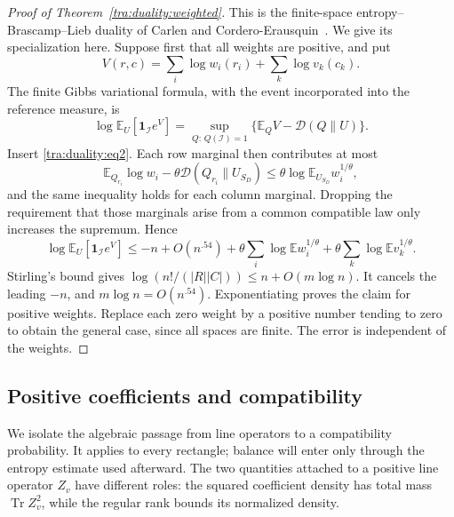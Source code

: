 \begin{proof}[Proof of Theorem~\ref{tra:duality:weighted}]\label{tra:duality:weighted-proof}
\label{tra:duality:entropy-duality-proof}
This is the finite-space entropy--Brascamp--Lieb duality of Carlen and Cordero-Erausquin~\cite[Theorem~2.1]{CarlenCorderoErausquin2009}. We give its specialization here. Suppose first that all weights are positive, and put
\[
 V(r,c)=\sum_i\log w_i(r_i)+\sum_k\log v_k(c_k).
\]
The finite Gibbs variational formula, with the event incorporated into the reference measure, is
\[
 \log\mathbb E_U[\mathbf1_{\mathcal I}e^V]
 =\sup_{Q:\,Q(\mathcal I)=1}\{\mathbb E_QV-\mathcal D(Q\|U)\}.
\]
Insert \eqref{tra:duality:eq2}. Each row marginal then contributes at most
\[
 \mathbb E_{Q_{r_i}}\log w_i
       -\theta\mathcal D(Q_{r_i}\|U_{S_D})
 \le\theta\log\mathbb E_{U_{S_D}}w_i^{1/\theta},
\]
and the same inequality holds for each column marginal. Dropping the requirement that those marginals arise from a common compatible law only increases the supremum. Hence
\[
 \log\mathbb E_U[\mathbf1_{\mathcal I}e^V]
 \le -n+O(n^{.54})
       +\theta\sum_i\log\mathbb Ew_i^{1/\theta}
       +\theta\sum_k\log\mathbb Ev_k^{1/\theta}.
\]
Stirling's bound gives
$\log(n!/(|R||C|))\le n+O(m\log n)$.
It cancels the leading $-n$, and $m\log n=O(n^{.54})$.
Exponentiating proves the claim for positive weights. Replace each zero weight by a positive number tending to zero to obtain the general case, since all spaces are finite. The error is independent of the weights.
\end{proof}
\subsection{Positive coefficients and compatibility}

We isolate the algebraic passage from line operators to a compatibility
probability. It applies to every rectangle; balance will enter only
through the entropy estimate used afterward. The two quantities attached
to a positive line operator $Z_v$ have different roles: the squared coefficient
density has total mass $\operatorname{Tr}Z_v^2$, while the regular rank
bounds its normalized density.

